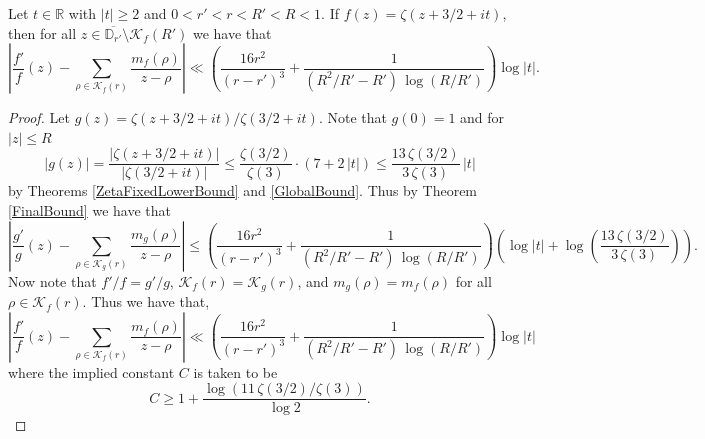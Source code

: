 \begin{theorem}[LogDerivZetaFinalBound]
\label{LogDerivZetaFinalBound}
\leanok
Let $t\in\mathbb{R}$ with $|t|\geq 2$ and $0 < r' < r < R' < R<1$. If
    $f(z)=\zeta(z+3/2+it)$, then for all
    $z\in\overline{\mathbb{D}_{r'}}\setminus\mathcal{K}_f(R')$ we have that
    $$\left|\frac{f'}{f}(z)-\sum_{\rho\in\mathcal{K}_f(r)}\frac{m_f(\rho)}{z-\rho}\right|
      \ll\left(\frac{16r^2}{(r-r')^3}+\frac{1}{(R^2/R'-R')\,\log(R/R')}\right)\log|t|.$$
\end{theorem}
\begin{proof}
\leanok
Let $g(z)=\zeta(z+3/2+it)/\zeta(3/2+it)$. Note that $g(0)=1$ and for $|z|\leq R$
    $$|g(z)|=\frac{|\zeta(z+3/2+it)|}{|\zeta(3/2+it)|}
      \leq\frac{\zeta(3/2)}{\zeta(3)}\cdot(7+2\,|t|)\leq\frac{13\,\zeta(3/2)}{3\,\zeta(3)}\,|t|$$
    by Theorems \ref{ZetaFixedLowerBound} and \ref{GlobalBound}. Thus by Theorem
    \ref{FinalBound} we have that
    $$\left|\frac{g'}{g}(z)-\sum_{\rho\in\mathcal{K}_g(r)}\frac{m_g(\rho)}{z-\rho}\right|
      \leq\left(\frac{16r^2}{(r-r')^3}+\frac{1}{(R^2/R'-R')\,\log(R/R')}\right)
      \left(\log|t|+\log\left(\frac{13\,\zeta(3/2)}{3\,\zeta(3)}\right)\right).$$
    Now note that $f'/f=g'/g$, $\mathcal{K}_f(r)=\mathcal{K}_g(r)$, and
    $m_g(\rho)=m_f(\rho)$ for all $\rho\in\mathcal{K}_f(r)$. Thus we have that,
    $$\left|\frac{f'}{f}(z)-\sum_{\rho\in\mathcal{K}_f(r)}\frac{m_f(\rho)}{z-\rho}\right|
      \ll\left(\frac{16r^2}{(r-r')^3}+\frac{1}{(R^2/R'-R')\,\log(R/R')}\right)\log|t|$$
    where the implied constant $C$ is taken to be
    $$C\geq 1+\frac{\log(11\,\zeta(3/2)/\zeta(3))}{\log 2}.$$
\end{proof}
